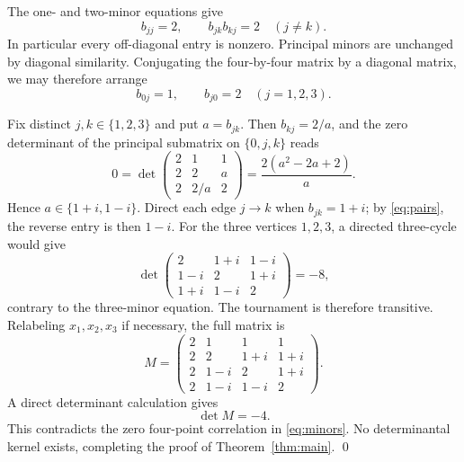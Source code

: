\documentclass[11pt]{article}
\begin{document}
The one- and two-minor equations give
\begin{equation}\label{eq:pairs}
 b_{jj}=2,\qquad b_{jk}b_{kj}=2\quad(j\ne k).
\end{equation}
In particular every off-diagonal entry is nonzero.  Principal minors are
unchanged by diagonal similarity.  Conjugating the four-by-four matrix by a
diagonal matrix, we may therefore arrange
\begin{equation}\label{eq:gauge}
 b_{0j}=1,\qquad b_{j0}=2\quad(j=1,2,3).
\end{equation}

Fix distinct $j,k\in\{1,2,3\}$ and put $a=b_{jk}$.  Then
$b_{kj}=2/a$, and the zero determinant of the principal submatrix on
$\{0,j,k\}$ reads
\begin{equation}\label{eq:quadratic}
 0=\det\begin{pmatrix}2&1&1\\2&2&a\\2&2/a&2\end{pmatrix}
 =\frac{2(a^2-2a+2)}a.
\end{equation}
Hence $a\in\{1+i,1-i\}$.  Direct each edge $j\to k$ when
$b_{jk}=1+i$; by \eqref{eq:pairs}, the reverse entry is then $1-i$.
For the three vertices $1,2,3$, a directed three-cycle would give
\begin{equation}\label{eq:cyclic}
 \det\begin{pmatrix}
 2&1+i&1-i\\1-i&2&1+i\\1+i&1-i&2
 \end{pmatrix}=-8,
\end{equation}
contrary to the three-minor equation.  The tournament is therefore
transitive.  Relabeling $x_1,x_2,x_3$ if necessary, the full matrix is
\begin{equation}\label{eq:normalmatrix}
 M=\begin{pmatrix}
 2&1&1&1\\
 2&2&1+i&1+i\\
 2&1-i&2&1+i\\
 2&1-i&1-i&2
 \end{pmatrix}.
\end{equation}
A direct determinant calculation gives
\begin{equation}\label{eq:minusfour}
 \det M=-4.
\end{equation}
This contradicts the zero four-point correlation in
\eqref{eq:minors}.  No determinantal kernel exists, completing the proof of
Theorem~\ref{thm:main}. \qed
\end{document}
